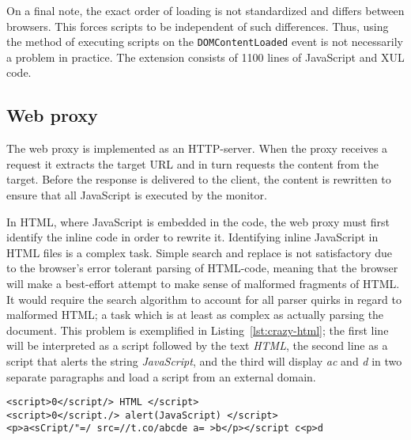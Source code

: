 \documentclass{llncs}
\newcommand{\todo}[1]{\colorbox{red}{\textcolor{white}{\sffamily\bfseries\scriptsize TODO}} \textcolor{red}{#1} \textcolor{red}{$\blacktriangleleft$}}
\begin{document}
On a final note, the exact order of loading is not standardized and differs between
browsers. This forces scripts to be independent of such differences. Thus,
using the method of executing scripts on the \lstinline{DOMContentLoaded} event is not
necessarily a problem in practice. 
%
The extension consists of 1100 lines of JavaScript and XUL code.




\subsection{Web proxy}

The web proxy is implemented as an HTTP-server. When the 
proxy receives a request it extracts the target URL and in turn requests the 
content from the target. Before the response is delivered to the client, the content is 
rewritten to ensure that all JavaScript is executed by the monitor. 

In HTML, where 
JavaScript is embedded in the code, the web proxy must first identify 
the inline code in order to rewrite it.
Identifying inline JavaScript in HTML files is a complex task. 
Simple search and replace is not satisfactory due to the browser's error tolerant parsing of HTML-code, meaning that the 
browser will make a best-effort attempt to make sense of malformed fragments of 
HTML. It would require the search 
algorithm to account for all parser quirks in regard to malformed HTML;
a task which is at least as complex as actually parsing the document.
This problem is exemplified in Listing~\ref{lst:crazy-html}; the first line
will be interpreted as a script followed by the text \emph{HTML}, the second
line as a script that alerts the string \emph{JavaScript}, and the third will 
display \emph{ac} and \emph{d} in two separate paragraphs and load a script
from an external domain.

\begin{lstlisting}[language=langsmall,label=lst:crazy-html, caption=Example of complicated HTML]
<script>0</script/> HTML </script>
<script>0</script./> alert(JavaScript) </script>
<p>a<sCript/"=/ src=//t.co/abcde a= >b</p></script c<p>d
\end{lstlisting}
\end{document}
